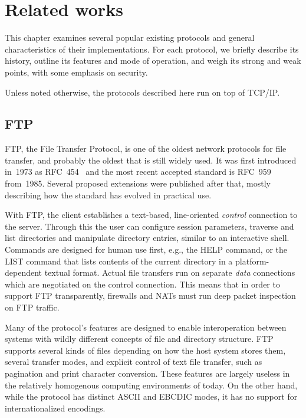 
\chapter{Related works}

This chapter examines several popular existing protocols and general characteristics of their implementations.
For each protocol, we briefly describe its history, outline its features and mode of operation, and weigh its
strong and weak points, with some emphasis on security.

Unless noted otherwise, the protocols described here run on top of TCP/IP.

\section{FTP}

FTP, the File Transfer Protocol, is one of the oldest network protocols for file transfer, and probably the
oldest that is still widely used. It was first introduced in~1973 as RFC~454~\cite{rfc454} and the most recent
accepted standard is RFC~959~\cite{rfc959} from~1985. Several proposed extensions were published after that,
mostly describing how the standard has evolved in practical use.

With FTP, the client establishes a text-based, line-oriented {\it control} connection to the server. Through this
the user can configure session parameters, traverse and list directories and manipulate directory entries,
similar to an interactive shell. Commands are designed for human use first, e.g., the HELP command, or the
LIST command that lists contents of the current directory in a platform-dependent textual format. Actual file
transfers run on separate {\it data} connections which are negotiated on the control connection. This means
that in order to support FTP transparently, firewalls and NATs must run deep packet inspection on FTP traffic.

Many of the protocol's features are designed to enable interoperation between systems with wildly different
concepts of file and directory structure. FTP supports several kinds of files depending on how the host system
stores them, several transfer modes, and explicit control of text file transfer, such as pagination and print
character conversion. These features are largely useless in the relatively homogenous computing environments
of today. On the other hand, while the protocol has distinct ASCII and EBCDIC modes, it has no support for
internationalized encodings.

